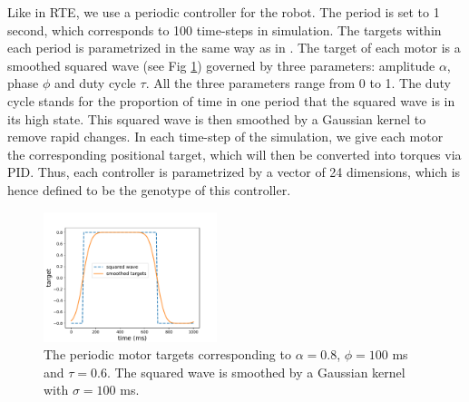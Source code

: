 \documentclass[journal]{IEEEtran}
\begin{document}
Like in RTE, we use a periodic controller for the robot.
The period is set to 1 second, which corresponds to 100 time-steps in simulation.
The targets within each period is parametrized in the same way as in \cite{cully2015robots}.
The target of each motor is a smoothed squared wave (see Fig \ref{targets}) governed by three parameters: amplitude $\alpha$, phase $\phi$ and duty cycle $\tau$.
All the three parameters range from 0 to 1.
The duty cycle stands for the proportion of time in one period that the squared wave is in its high state.
This squared wave is then smoothed by a Gaussian kernel to remove rapid changes.
In each time-step of the simulation, we give each motor the corresponding positional target, which will then be converted into torques via PID.
Thus, each controller is parametrized by a vector of 24 dimensions, which is hence defined to be the genotype of this controller.
%
%
\begin{figure}[H]
\centering
\includegraphics[width=0.45\textwidth]{targets.pdf}
\caption{The periodic motor targets corresponding to $\alpha = 0.8$, $\phi=100$ ms and $\tau=0.6$.
The squared wave is smoothed by a Gaussian kernel with $\sigma = 100$ ms.
}
\label{targets}
\end{figure}
\end{document}
